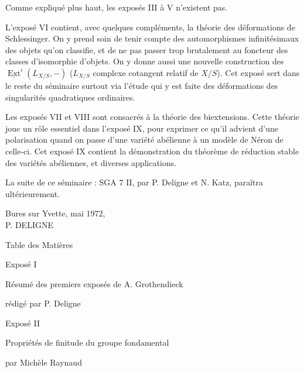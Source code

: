 Comme expliqué plus haut, les exposés III à V n'existent pas.
\clearpage

L'exposé VI contient, avec quelques compléments, la théorie des déformations
de Schlessinger. On y prend soin de tenir compte des automorphismes infinitésimaux
des objets qu'on classifie, et de ne pas passer trop brutalement au foncteur des classes
d'isomorphie d'objets. On y donne aussi une nouvelle construction des
$\underline{\operatorname{Ext}}^{i}(L_{X/S},-)$ ($L_{X/S}$ complexe cotangent relatif de $X/S$). Cet exposé sert dans le
reste du séminaire surtout via l'étude qui y est faite des déformations des singularités
quadratiques ordinaires.

Les exposés VII et VIII sont consacrés à la théorie des biextensions. Cette
théorie joue un rôle essentiel dans l'exposé IX, pour exprimer ce qu'il advient d'une
polarisation quand on passe d'une variété abélienne à un modèle de Néron de celle-ci.
Cet exposé IX contient la démonstration du théorème de réduction stable des variétés
abéliennes, et diverses applications.

La suite de ce séminaire : SGA 7 II, par P. Deligne et N. Katz, paraîtra
ultérieurement.

\begin{flushright}
Bures sur Yvette, mai 1972,\\
P. DELIGNE
\end{flushright}
\clearpage

\null
\clearpage

\begin{center}
Table des Matières
\end{center}

\noindent
Exposé I\par
\hspace*{2em}Résumé des premiers exposés de A. Grothendieck\par
\hspace*{2em}rédigé par P. Deligne \par

\medskip
\noindent
Exposé II\par
\hspace*{2em}Propriétés de finitude du groupe fondamental\par
\hspace*{2em}par Michèle Raynaud \par

